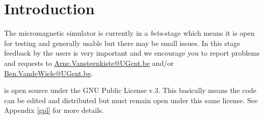 \section*{Introduction}

The \mumax micromagnetic simulator is currently in a \emph{beta}-stage which means it is open for testing and generally usable but there may be small issues. In this stage feedback by the users is very important and we encourage you to report problems and requests to \url{Arne.Vansteenkiste@UGent.be} and/or \url{Ben.VandeWiele@UGent.be}.


\mumax is open source under the GNU Public License v.3. This basically means the code can be edited and distributed but must remain open under this same license. See Appendix \ref{gpl} for more details.
